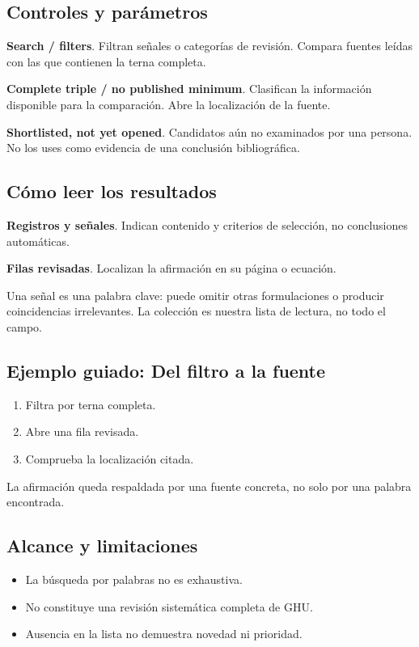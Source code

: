 \documentclass[11pt,a4paper]{article}
\begin{document}
\subsection*{Controles y parámetros}
\textbf{Search / filters}. Filtran señales o categorías de revisión. Compara fuentes leídas con las que contienen la terna completa.

\textbf{Complete triple / no published minimum}. Clasifican la información disponible para la comparación. Abre la localización de la fuente.

\textbf{Shortlisted, not yet opened}. Candidatos aún no examinados por una persona. No los uses como evidencia de una conclusión bibliográfica.

\subsection*{Cómo leer los resultados}
\textbf{Registros y señales}. Indican contenido y criterios de selección, no conclusiones automáticas.

\textbf{Filas revisadas}. Localizan la afirmación en su página o ecuación.

Una señal es una palabra clave: puede omitir otras formulaciones o producir coincidencias irrelevantes. La colección es nuestra lista de lectura, no todo el campo.
\subsection*{Ejemplo guiado: Del filtro a la fuente}
\begin{enumerate}
\item Filtra por terna completa.
\item Abre una fila revisada.
\item Comprueba la localización citada.
\end{enumerate}
La afirmación queda respaldada por una fuente concreta, no solo por una palabra encontrada.
\subsection*{Alcance y limitaciones}
\begin{itemize}
\item La búsqueda por palabras no es exhaustiva.
\item No constituye una revisión sistemática completa de GHU.
\item Ausencia en la lista no demuestra novedad ni prioridad.
\end{itemize}
\end{document}
